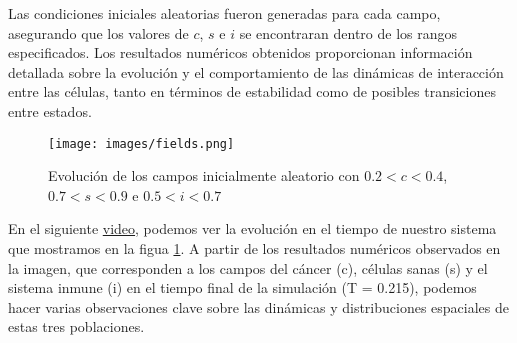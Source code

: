 \documentclass{article}
\begin{document}
Las condiciones iniciales aleatorias fueron generadas para cada campo, asegurando que los valores de $c$, $s$ e $i$ se encontraran dentro de los rangos especificados. Los resultados numéricos obtenidos proporcionan información detallada sobre la evolución y el comportamiento de las dinámicas de interacción entre las células, tanto en términos de estabilidad como de posibles transiciones entre estados.



\begin{figure}[htbp]
    \centering
    \texttt{[image: images/fields.png]}
    \caption{Evolución de los campos inicialmente aleatorio con $0.2< c < 0.4$, $0.7 < s < 0.9$ e $0.5 < i < 0.7$}
    \label{fig:fields_evolution}
\end{figure}



En el siguiente \href{https://drive.google.com/file/d/1lAHa3TRPTFROOFaI3XvsIvU65_pN7HG5/view?usp=sharing}{video}, podemos ver la evolución en el tiempo de nuestro sistema que mostramos en la figua \ref{fig:fields_evolution}. A partir de los resultados numéricos observados en la imagen, que corresponden a los campos del cáncer (c), células sanas (s) y el sistema inmune (i) en el tiempo final de la simulación (T = 0.215), podemos hacer varias observaciones clave sobre las dinámicas y distribuciones espaciales de estas tres poblaciones.
\end{document}
